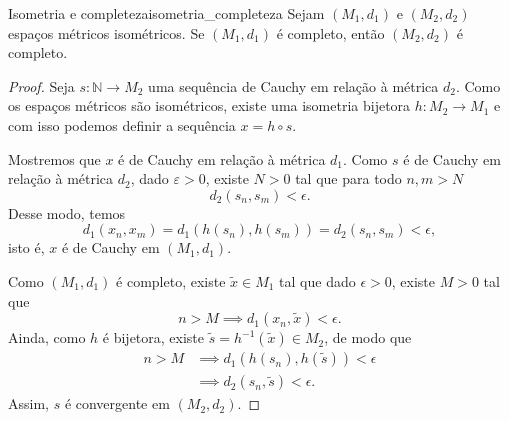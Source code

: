 \begin{lemma}{Isometria e completeza}{isometria_completeza}
    Sejam \((M_1, d_1)\) e \((M_2, d_2)\) espaços métricos isométricos. Se \((M_1, d_1)\) é completo, então \((M_2, d_2)\) é completo.
\end{lemma}
\begin{proof}
    Seja \(s : \mathbb{N} \to M_2\) uma sequência de Cauchy em relação à métrica \(d_2\). Como os espaços métricos são isométricos, existe uma isometria bijetora \(h : M_2 \to M_1\) e com isso podemos definir a sequência \(x = h \circ s\).

    Mostremos que \(x\) é de Cauchy em relação à métrica \(d_1\). Como \(s\) é de Cauchy em relação à métrica \(d_2\), dado \(\varepsilon > 0\), existe \(N > 0\) tal que para todo \(n, m > N\)
    \begin{equation*}
        d_2(s_n, s_m) < \epsilon.
    \end{equation*}
    Desse modo, temos
    \begin{equation*}
        d_1(x_n, x_m) = d_1(h(s_n), h(s_m)) = d_2(s_n, s_m) < \epsilon,
    \end{equation*}
    isto é, \(x\) é de Cauchy em \((M_1, d_1)\).

    Como \((M_1, d_1)\) é completo, existe \(\tilde{x} \in M_1\) tal que dado \(\epsilon > 0\), existe \(M > 0\) tal que
    \begin{equation*}
        n > M \implies d_1(x_n, \tilde{x}) < \epsilon.
    \end{equation*}
    Ainda, como \(h\) é bijetora, existe \(\tilde{s} = h^{-1}(\tilde{x}) \in M_2\), de modo que
    \begin{align*}
        n > M &\implies d_1(h(s_n), h(\tilde{s})) < \epsilon\\
              &\implies d_2(s_n, \tilde{s}) < \epsilon.
    \end{align*}
    Assim, \(s\) é convergente em \((M_2, d_2)\).
\end{proof}
